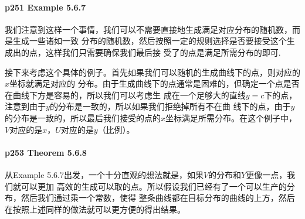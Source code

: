   \paragraph{p251 Example 5.6.7}
    我们注意到这样一个事情，我们可以不需要直接地生成满足对应分布的随机数，而是生成一些诸如一致
    分布的随机数，然后按照一定的规则选择是否要接受这个生成出的点，这样我们只需要确保我们最后接
    受了的点是满足所需分布的即可. \par
    接下来考虑这个具体的例子。首先如果我们可以随机的生成曲线下的点，则对应的$x$坐标就满足对应的
    分布。由于生成曲线下的点通常是困难的，但确定一个点是否在曲线下方是容易的，所以我们可以考虑生
    成在一个足够大的直线$y=c$下的点，注意到由于$y$的分布是一致的，所以如果我们拒绝掉所有不在曲
    线下的点，由于$y$的分布是一致的，所以最后我们接受的点的$x$坐标满足所需分布。在这个例子中，
    $V$对应的是$x$，$U$对应的是$y$（比例）。

  \paragraph{p253 Theorem 5.6.8}
    从Example 5.6.7出发，一个十分直观的想法就是，如果$V$的分布和$Y$更像一点，我们就可以更加
    高效的生成可以取的点。所以假设我们已经有了一个可以生产的分布，然后我们通过乘一个常数，使得
    整条曲线都在目标分布的曲线的上方，然后在按照上述同样的做法就可以更方便的得出结果。




